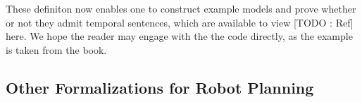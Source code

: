 \documentclass{article}
\begin{document}
\begin{code}%
%
\>[2]\<%
\\
%
\>[2]\AgdaSpace{}%
\AgdaSymbol{:}\AgdaSpace{}%
\AgdaSymbol{(}\AgdaSpace{}%
\AgdaSymbol{:}\AgdaSpace{}%
\AgdaSpace{}%
\AgdaSymbol{)}\AgdaSpace{}%
\AgdaSpace{}%
\AgdaSymbol{(}\AgdaSpace{}%
\AgdaSymbol{:}\AgdaSpace{}%
\AgdaSpace{}%
\AgdaSymbol{)}\AgdaSpace{}%
\AgdaSpace{}%
\AgdaSpace{}%
\AgdaSpace{}%
\<%
\\
%
\>[2]%
\>[895I]\AgdaOperator{\AgdaFunction{,,}}\AgdaSpace{}%
\AgdaSpace{}%
\AgdaSpace{}%
\AgdaSpace{}%
\AgdaSymbol{=}\AgdaSpace{}%
\AgdaSpace{}%
\AgdaSymbol{(}\AgdaSpace{}%
\AgdaSymbol{:}\AgdaSpace{}%
\AgdaSymbol{)}\AgdaSpace{}%
\AgdaSpace{}%
\AgdaSpace{}%
\AgdaSpace{}%
\AgdaSpace{}%
\AgdaSpace{}%
\AgdaSpace{}%
\AgdaSpace{}%
\AgdaSpace{}%
\<%
\end{code}
\begin{code}[hide]%
\>[.][@{}l@{}]\<[895I]%
\>[4]\AgdaSpace{}%
\AgdaSpace{}%
\AgdaSpace{}%
\AgdaSpace{}%
\AgdaSpace{}%
\AgdaSpace{}%
\AgdaSymbol{(}\AgdaSymbol{)}\<%
\end{code}

These definiton now enables one to construct example models and prove whether or
not they admit temporal sentences, which are available to view [TODO : Ref]
here. We hope the reader may engage with the the code directly, as the example
is taken from the book.


\subsection{Other Formalizations for Robot Planning}

\printbibliography
\end{document}
